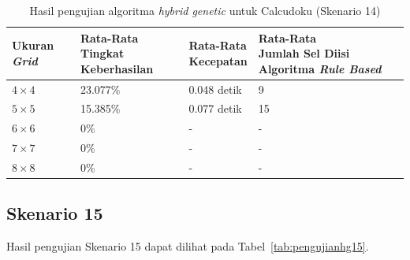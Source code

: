 \begin{table}
\centering
\captionsetup{justification=centering}
\caption[Hasil pengujian algoritma \textit{hybrid genetic} untuk Calcudoku (Skenario 14)]{Hasil pengujian algoritma \textit{hybrid genetic} untuk Calcudoku (Skenario 14)}
\begin{tabular}{| l | l | l | l |}
\hline
Ukuran \textit{Grid} & \makecell[c]{Rata-Rata \\ Tingkat Keberhasilan} & \makecell[c]{Rata-Rata \\ Kecepatan} & \makecell[c]{Rata-Rata \\ Jumlah Sel Diisi Algoritma \textit{Rule Based}} \\
\hline \hline
\begin{math}4 \times 4\end{math} & 23.077\% & 0.048 detik & 9 \\
\hline
\begin{math}5 \times 5\end{math} & 15.385\% & 0.077 detik & 15 \\
\hline
\begin{math}6 \times 6\end{math} & 0\% & - & - \\
\hline
\begin{math}7 \times 7\end{math} & 0\% & - & - \\
\hline
\begin{math}8 \times 8\end{math} & 0\% & - & - \\
\hline
\end{tabular}
\label{tab:pengujianhg14}
\end{table}

\subsection{Skenario 15}
\label{sec:skenario15}

Hasil pengujian Skenario 15 dapat dilihat pada Tabel~\ref{tab:pengujianhg15}.

